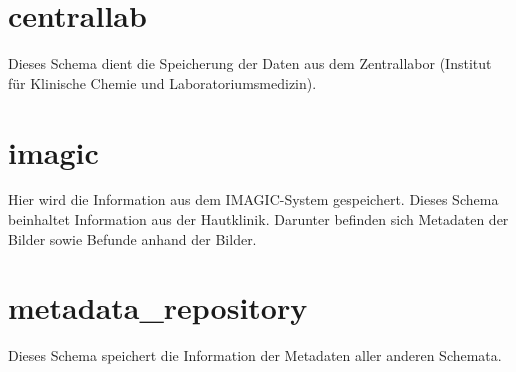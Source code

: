   	\section{centrallab} \label{sc:centrallab}
  Dieses Schema dient die Speicherung der Daten aus dem Zentrallabor (Institut für Klinische Chemie und Laboratoriumsmedizin).

	\section{imagic} \label{sc:imagic}
	Hier wird die Information aus dem IMAGIC-System gespeichert. Dieses Schema beinhaltet Information aus der Hautklinik. Darunter befinden sich Metadaten der Bilder sowie Befunde anhand der Bilder.

	\section{metadata\_repository} \label{sc:metadata}
 	Dieses Schema speichert die Information der Metadaten aller anderen Schemata.
  
